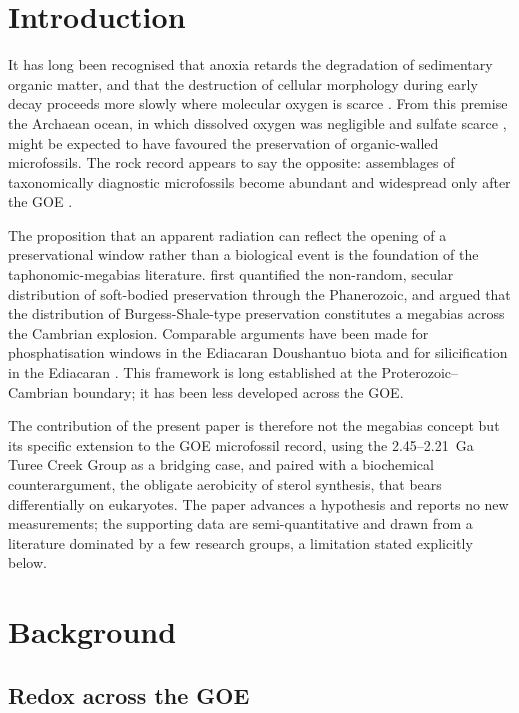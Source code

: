 \documentclass[11pt]{article}
\begin{document}
\section{Introduction}

It has long been recognised that anoxia retards the degradation of sedimentary organic matter, and
that the destruction of cellular morphology during early decay proceeds more slowly where molecular
oxygen is scarce \citep{Canfield1994,Hedges1995}. From this premise the Archaean ocean, in which
dissolved oxygen was negligible \citep{Pavlov2002} and sulfate scarce \citep{Habicht2002,Crowe2014},
might be expected to have favoured the preservation of organic-walled microfossils. The rock record
appears to say the opposite: assemblages of taxonomically diagnostic microfossils become abundant
and widespread only after the GOE \citep{Javaux2018,Wacey2014}.

The proposition that an apparent radiation can reflect the opening of a preservational window rather
than a biological event is the foundation of the taphonomic-megabias literature. \citet{Allison1993}
first quantified the non-random, secular distribution of soft-bodied preservation through the
Phanerozoic, and \citet{Butterfield2003} argued that the distribution of Burgess-Shale-type
preservation constitutes a megabias across the Cambrian explosion. Comparable arguments have been
made for phosphatisation windows in the Ediacaran Doushantuo biota and for silicification in the
Ediacaran \citep{Tarhan2016}. This framework is long established at the Proterozoic--Cambrian
boundary; it has been less developed across the GOE.

The contribution of the present paper is therefore not the megabias concept but its specific
extension to the GOE microfossil record, using the 2.45--2.21~Ga Turee Creek Group as a bridging
case, and paired with a biochemical counterargument, the obligate aerobicity of sterol synthesis,
that bears differentially on eukaryotes. The paper advances a hypothesis and reports no new
measurements; the supporting data are semi-quantitative and drawn from a literature dominated by a
few research groups, a limitation stated explicitly below.

\section{Background}

\subsection{Redox across the GOE}
\end{document}
